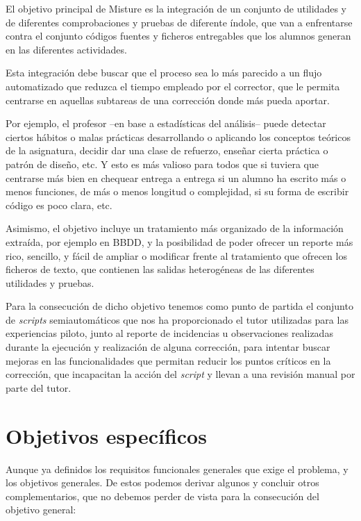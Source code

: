 El objetivo principal de Misture es la integración de un conjunto de utilidades y de diferentes comprobaciones y pruebas de diferente índole, que van a enfrentarse contra el conjunto códigos fuentes y ficheros entregables que los alumnos generan en las diferentes actividades.


Esta integración debe buscar que el proceso sea lo más parecido a un flujo automatizado que reduzca el tiempo empleado por el corrector, que le permita centrarse en aquellas subtareas de una corrección donde más pueda aportar.


Por ejemplo, el profesor --en base a estadísticas del análisis-- puede detectar ciertos hábitos o malas prácticas desarrollando o aplicando los conceptos teóricos de la asignatura, decidir dar una clase de refuerzo, enseñar cierta práctica o patrón de diseño, etc. Y esto es más valioso para todos que si tuviera que centrarse más bien en chequear entrega a entrega si un alumno ha escrito más o menos funciones, de más o menos longitud o complejidad, si su forma de escribir código es poco clara, etc.


Asimismo, el objetivo incluye un tratamiento más organizado de la información extraída, por ejemplo en BBDD, y la posibilidad de poder ofrecer un reporte más rico, sencillo, y fácil de ampliar o modificar frente al tratamiento que ofrecen los ficheros de texto, que contienen las salidas heterogéneas de las diferentes utilidades y pruebas.


Para la consecución de dicho objetivo tenemos como punto de partida el conjunto de \textit{scripts} semiautomáticos que nos ha proporcionado el tutor utilizadas para las experiencias piloto, junto al reporte de incidencias u observaciones realizadas durante la ejecución y realización de alguna corrección, para intentar buscar mejoras en las funcionalidades que permitan reducir los puntos críticos en la corrección, que incapacitan la acción del \textit{script} y llevan a una revisión manual por parte del tutor. 


\section{Objetivos específicos}
\label{sec:obj_esp}


Aunque ya definidos los requisitos funcionales generales que exige el problema, y los objetivos generales. De estos podemos derivar algunos y concluir otros complementarios, que no debemos perder de vista para la consecución del objetivo general:


